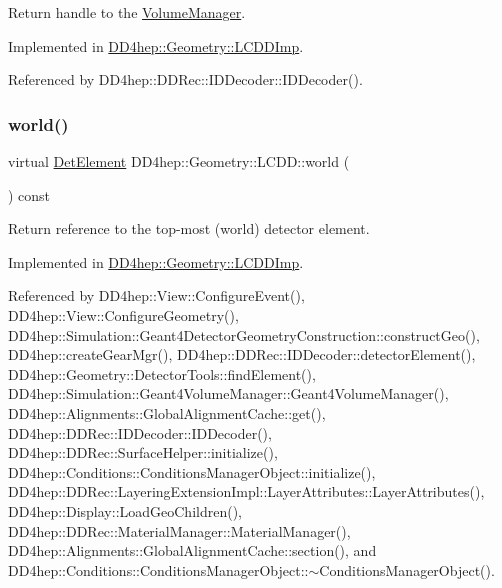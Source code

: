 Return handle to the \hyperlink{class_d_d4hep_1_1_geometry_1_1_volume_manager}{Volume\+Manager}. 



Implemented in \hyperlink{class_d_d4hep_1_1_geometry_1_1_l_c_d_d_imp_a5fee28118cf380641f704a1139d46c4b}{D\+D4hep\+::\+Geometry\+::\+L\+C\+D\+D\+Imp}.



Referenced by D\+D4hep\+::\+D\+D\+Rec\+::\+I\+D\+Decoder\+::\+I\+D\+Decoder().

\hypertarget{class_d_d4hep_1_1_geometry_1_1_l_c_d_d_ae61d027023791272cf976432c0b3a977}{}\label{class_d_d4hep_1_1_geometry_1_1_l_c_d_d_ae61d027023791272cf976432c0b3a977} 
\subsubsection{\texorpdfstring{world()}{world()}}
{\footnotesize\ttfamily virtual \hyperlink{class_d_d4hep_1_1_geometry_1_1_det_element}{Det\+Element} D\+D4hep\+::\+Geometry\+::\+L\+C\+D\+D\+::world (\begin{DoxyParamCaption}{ }\end{DoxyParamCaption}) const\hspace{0.3cm}{\ttfamily [pure virtual]}}



Return reference to the top-\/most (world) detector element. 



Implemented in \hyperlink{class_d_d4hep_1_1_geometry_1_1_l_c_d_d_imp_a6c6988d4772aef0d4a7946865b15962d}{D\+D4hep\+::\+Geometry\+::\+L\+C\+D\+D\+Imp}.



Referenced by D\+D4hep\+::\+View\+::\+Configure\+Event(), D\+D4hep\+::\+View\+::\+Configure\+Geometry(), D\+D4hep\+::\+Simulation\+::\+Geant4\+Detector\+Geometry\+Construction\+::construct\+Geo(), D\+D4hep\+::create\+Gear\+Mgr(), D\+D4hep\+::\+D\+D\+Rec\+::\+I\+D\+Decoder\+::detector\+Element(), D\+D4hep\+::\+Geometry\+::\+Detector\+Tools\+::find\+Element(), D\+D4hep\+::\+Simulation\+::\+Geant4\+Volume\+Manager\+::\+Geant4\+Volume\+Manager(), D\+D4hep\+::\+Alignments\+::\+Global\+Alignment\+Cache\+::get(), D\+D4hep\+::\+D\+D\+Rec\+::\+I\+D\+Decoder\+::\+I\+D\+Decoder(), D\+D4hep\+::\+D\+D\+Rec\+::\+Surface\+Helper\+::initialize(), D\+D4hep\+::\+Conditions\+::\+Conditions\+Manager\+Object\+::initialize(), D\+D4hep\+::\+D\+D\+Rec\+::\+Layering\+Extension\+Impl\+::\+Layer\+Attributes\+::\+Layer\+Attributes(), D\+D4hep\+::\+Display\+::\+Load\+Geo\+Children(), D\+D4hep\+::\+D\+D\+Rec\+::\+Material\+Manager\+::\+Material\+Manager(), D\+D4hep\+::\+Alignments\+::\+Global\+Alignment\+Cache\+::section(), and D\+D4hep\+::\+Conditions\+::\+Conditions\+Manager\+Object\+::$\sim$\+Conditions\+Manager\+Object().

